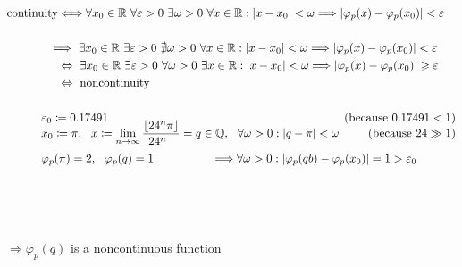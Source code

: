 \documentclass[12pt, a4paper]{article}
\begin{document}
\begin{align*}
\text{continuity}&\Longleftrightarrow \forall x_0\in\mathbb{R} ~\forall \varepsilon>0 ~\exists\omega>0 ~\forall x\in \mathbb{R}    : |x-x_0|<\omega \Longrightarrow |\varphi_p(x)-\varphi_p(x_0)| < \varepsilon\\~\\
 & \hspace*{-2.5mm}\Longrightarrow~\exists x_0\in\mathbb{R} ~\exists \varepsilon>0 ~\nexists \omega>0 ~\forall x\in \mathbb{R} : |x-x_0|<\omega \Longrightarrow |\varphi_p(x)-\varphi_p(x_0)| < \varepsilon\\
& \Leftrightarrow  ~\exists x_0\in\mathbb{R} ~\exists \varepsilon>0 ~\forall \omega>0 ~\exists x\in \mathbb{R} : |x-x_0|<\omega \Longrightarrow |\varphi_p(x)-\varphi_p(x_0)| \geqslant \varepsilon\\
& \Leftrightarrow ~\text{noncontinuity}\\~\\
&\hspace*{-0.5cm} \varepsilon_0 \coloneqq 0.17491 & \mathllap{\text{(because }0.17491<1)}\\[-3mm]
&\hspace*{-0.5cm} x_0 \coloneqq \pi, ~~x \coloneqq \lim_{n\rightarrow\infty}\frac{\lfloor{24^n\pi}\rfloor}{\phantom{\lceil}{24^n}\phantom{\pi\rceil}} = q \in \mathbb{Q}, ~~\forall\omega>0: |q-\pi|<\omega & \mathllap{\text{(because }24\gg1)}\\
&\hspace*{-0.5cm} \varphi_p(\pi)=2, ~~\varphi_p(q)=1 \hspace{17.5mm}\Longrightarrow \forall\omega>0: |\varphi_p(qb)-\varphi_p(x_0)| = 1 > \varepsilon_0
\end{align*}\\~\\~\\
\begin{Large}$\Longrightarrow \varphi_p(q)$ is a noncontinuous function\end{Large}
\end{document}

